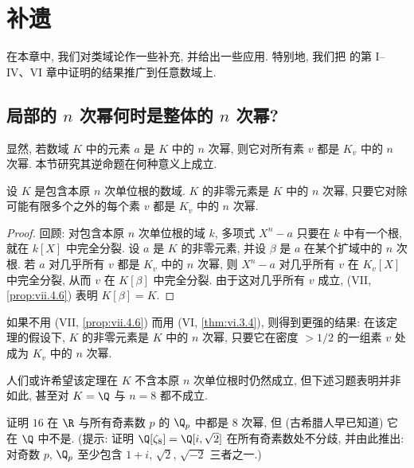 \chapter{补遗}\label{ch:VIII}

在本章中, 我们对类域论作一些补充, 并给出一些应用. 特别地, 我们把 \cite{Serre1970} 的第 I--IV、VI 章中证明的结果推广到任意数域上.

\section{局部的 \texorpdfstring{$n$}{n} 次幂何时是整体的 \texorpdfstring{$n$}{n} 次幂?}\label{sec:VIII.1}

显然, 若数域 $K$ 中的元素 $a$ 是 $K$ 中的 $n$ 次幂, 则它对所有素 $v$ 都是 $K_v$ 中的 $n$ 次幂. 本节研究其逆命题在何种意义上成立.

\begin{theorem}\label{thm:viii.1.1}
设 $K$ 是包含本原 $n$ 次单位根的数域. $K$ 的非零元素是 $K$ 中的 $n$ 次幂, 只要它对除可能有限多个之外的每个素 $v$ 都是 $K_v$ 中的 $n$ 次幂.
\end{theorem}

\begin{proof}
回顾: 对包含本原 $n$ 次单位根的域 $k$, 多项式 $X^{n}-a$ 只要在 $k$ 中有一个根, 就在 $k[X]$ 中完全分裂. 设 $a$ 是 $K$ 的非零元素, 并设 $\beta$ 是 $a$ 在某个扩域中的 $n$ 次根. 若 $a$ 对几乎所有 $v$ 都是 $K_v$ 中的 $n$ 次幂, 则 $X^{n}-a$ 对几乎所有 $v$ 在 $K_v[X]$ 中完全分裂, 从而 $v$ 在 $K[\beta]$ 中完全分裂. 由于这对几乎所有 $v$ 成立, (VII, \ref{prop:vii.4.6}) 表明 $K[\beta]=K$.
\end{proof}

\begin{remark}\label{rem:viii.1.2}
如果不用 (VII, \ref{prop:vii.4.6}) 而用 (VI, \ref{thm:vi.3.4}), 则得到更强的结果: 在该定理的假设下, $K$ 的非零元素是 $K$ 中的 $n$ 次幂, 只要它在密度 $>1/2$ 的一组素 $v$ 处成为 $K_v$ 中的 $n$ 次幂.
\end{remark}

人们或许希望该定理在 $K$ 不含本原 $n$ 次单位根时仍然成立, 但下述习题表明并非如此, 甚至对 $K=\Q$ 与 $n=8$ 都不成立.

\begin{exercise}\label{exc:viii.1.3}
证明 $16$ 在 $\R$ 与所有奇素数 $p$ 的 $\Q_p$ 中都是 $8$ 次幂, 但 (古希腊人早已知道) 它在 $\Q$ 中不是. (提示: 证明 $\Q[\zeta_8]=\Q[i,\sqrt{2}]$ 在所有奇素数处不分歧, 并由此推出: 对奇数 $p$, $\Q_p$ 至少包含 $1+i$, $\sqrt{2}$, $\sqrt{-2}$ 三者之一.)
\end{exercise}

